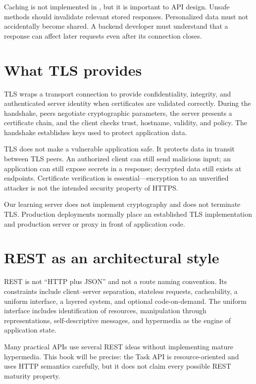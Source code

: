 Caching is not implemented in , but it is important to API design.
Unsafe methods should invalidate relevant stored responses. Personalized data
must not accidentally become shared. A backend developer must understand that a
response can affect later requests even after its connection closes.

\section{What TLS provides}

TLS wraps a transport connection to provide confidentiality, integrity, and
authenticated server identity when certificates are validated correctly. During
the handshake, peers negotiate cryptographic parameters, the server presents a
certificate chain, and the client checks trust, hostname, validity, and policy.
The handshake establishes keys used to protect application data.

TLS does not make a vulnerable application safe. It protects data in transit
between TLS peers. An authorized client can still send malicious input; an
application can still expose secrets in a response; decrypted data still exists
at endpoints. Certificate verification is essential---encryption to an
unverified attacker is not the intended security property of HTTPS.

Our learning server does not implement cryptography and does not terminate TLS.
Production deployments normally place an established TLS implementation and
production server or proxy in front of application code.

\section{REST as an architectural style}

REST is not ``HTTP plus JSON'' and not a route naming convention. Its constraints
include client--server separation, stateless requests, cacheability, a uniform
interface, a layered system, and optional code-on-demand. The uniform interface
includes identification of resources, manipulation through representations,
self-descriptive messages, and hypermedia as the engine of application state.

Many practical APIs use several REST ideas without implementing mature
hypermedia. This book will be precise: the Task API is resource-oriented and
uses HTTP semantics carefully, but it does not claim every possible REST
maturity property.


